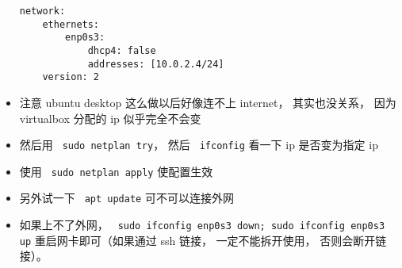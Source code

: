 \begin{itemize}
\begin{lstlisting}[language=none]
network:
    ethernets:
        enp0s3:
            dhcp4: false
            addresses: [10.0.2.4/24]
    version: 2
\end{lstlisting}
\item 注意 ubuntu desktop 这么做以后好像连不上 internet， 其实也没关系， 因为 virtualbox 分配的 ip 似乎完全不会变
\item 然后用 \verb` sudo netplan try`， 然后 \verb` ifconfig` 看一下 ip 是否变为指定 ip
\item 使用 \verb` sudo netplan apply` 使配置生效
\item 另外试一下 \verb` apt update` 可不可以连接外网
\item 如果上不了外网， \verb` sudo ifconfig enp0s3 down; sudo ifconfig enp0s3 up` 重启网卡即可（如果通过 ssh 链接， 一定不能拆开使用， 否则会断开链接）。
\end{itemize}
